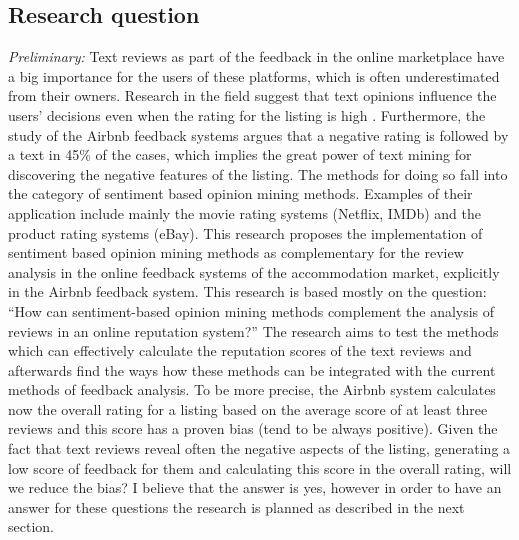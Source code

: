 \subsection{Research question}
\textit{Preliminary:} Text reviews as part of the feedback in the online marketplace have a big importance for the users of
these platforms, which is often underestimated from their owners. Research in the field suggest that text
opinions influence the users’ decisions even when the rating for the listing is high \cite{fradkin2016bias}. Furthermore, the
study of the Airbnb feedback systems argues that a negative rating is followed by a text in 45\% of the cases,
which implies the great power of text mining for discovering the negative features of the listing. The methods for doing so fall into the category of sentiment based opinion mining methods. Examples of their application include mainly the movie rating systems (Netflix, IMDb) and the product rating systems (eBay).
This research proposes the implementation of sentiment based opinion mining methods as complementary for the review analysis in the online feedback systems of the accommodation market, explicitly in the Airbnb feedback system.
This research is based mostly on the question: “How can sentiment-based opinion mining methods complement the analysis of reviews in an online reputation system?” The research aims to test the methods which can effectively calculate the reputation scores of the text reviews and afterwards find the ways how these methods can be integrated with the current methods of feedback analysis. To be more precise, the Airbnb system calculates now the overall rating for a listing based on the average score of at least three reviews and this score has a proven bias (tend to be always positive). Given the fact that text reviews reveal often the negative aspects of the listing, generating a low score of feedback for them and calculating this score in the overall rating, will we reduce the bias? I believe that the answer is yes, however in order to have an answer for these questions the research is planned as described in the next section.